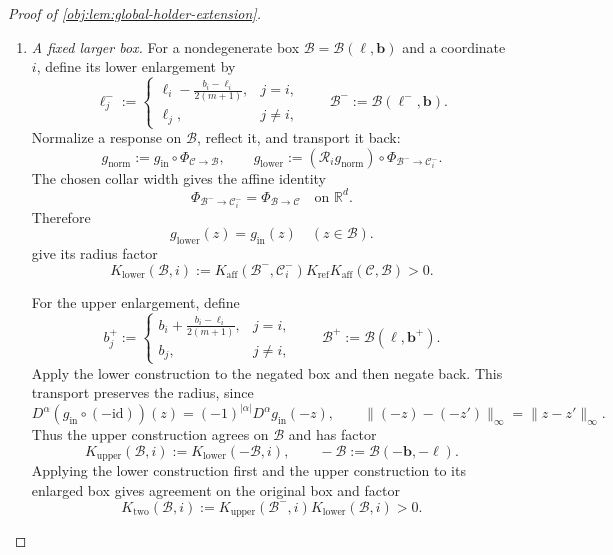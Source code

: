\begin{proof}[Proof of \cref{obj:lem:global-holder-extension}]
\begin{enumerate}
\item\label{proof:global-holder-extension:larger-box} \emph{A fixed larger box.}
For a nondegenerate box
\(\mathcal B=\mathcal B(\boldsymbol\ell,\boldsymbol b)\) and a coordinate \(i\), define its lower enlargement by
\[
\ell_j^-:=
\begin{cases}
\displaystyle\ell_i-\frac{b_i-\ell_i}{2(m+1)},&j=i,\\
\ell_j,&j\ne i,
\end{cases}
\qquad
\mathcal B^-:=\mathcal B(\boldsymbol\ell^-,\boldsymbol b).
\]
Normalize a response on \(\mathcal B\), reflect it, and transport it back:
\[
g_{\mathrm{norm}}
:=g_{\mathrm{in}}\circ\Phi_{\mathcal C\to\mathcal B},
\qquad
g_{\mathrm{lower}}
:=(\mathscr R_i g_{\mathrm{norm}})
\circ\Phi_{\mathcal B^-\to\mathcal C_i^-}.
\]
The chosen collar width gives the affine identity
\[
\Phi_{\mathcal B^-\to\mathcal C_i^-}
=\Phi_{\mathcal B\to\mathcal C}
\quad\text{on }\mathbb R^d.
\]
Therefore
\[
g_{\mathrm{lower}}(z)=g_{\mathrm{in}}(z)
\quad(z\in\mathcal B).
\]
 give its radius factor
\[
K_{\mathrm{lower}}(\mathcal B,i)
:=
K_{\mathrm{aff}}(\mathcal B^-,\mathcal C_i^-)
K_{\mathrm{ref}}
K_{\mathrm{aff}}(\mathcal C,\mathcal B)>0.
\]

For the upper enlargement, define
\[
b_j^+:=
\begin{cases}
\displaystyle b_i+\frac{b_i-\ell_i}{2(m+1)},&j=i,\\
b_j,&j\ne i,
\end{cases}
\qquad
\mathcal B^+:=\mathcal B(\boldsymbol\ell,\boldsymbol b^+).
\]
Apply the lower construction to the negated box and then negate back. This transport preserves the radius, since
\[
D^\alpha(g_{\mathrm{in}}\circ(-\mathrm{id}))(z)
=(-1)^{|\alpha|}D^\alpha g_{\mathrm{in}}(-z),
\qquad
\|(-z)-(-z')\|_\infty=\|z-z'\|_\infty.
\]
Thus the upper construction agrees on \(\mathcal B\) and has factor
\[
K_{\mathrm{upper}}(\mathcal B,i)
:=K_{\mathrm{lower}}(-\mathcal B,i),
\qquad
-\mathcal B:=\mathcal B(-\boldsymbol b,-\boldsymbol\ell).
\]
Applying the lower construction first and the upper construction to its enlarged box gives agreement on the original box and factor
\[
K_{\mathrm{two}}(\mathcal B,i)
:=K_{\mathrm{upper}}(\mathcal B^-,i)
K_{\mathrm{lower}}(\mathcal B,i)>0.
\]


\end{enumerate}
\end{proof}

